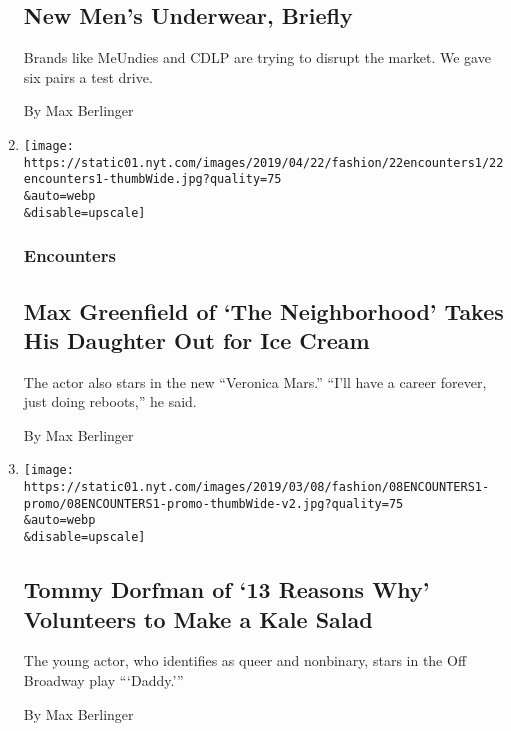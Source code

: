 \begin{enumerate}
  \hypertarget{new-mens-underwear-briefly}{%
  \subsection{New Men's Underwear,
  Briefly}\label{new-mens-underwear-briefly}}

  Brands like MeUndies and CDLP are trying to disrupt the market. We
  gave six pairs a test drive.

  By Max Berlinger
\item
  \href{/2019/04/12/style/max-greenfield-the-neighborhood.html}{}

  \texttt{[image: https://static01.nyt.com/images/2019/04/22/fashion/22encounters1/22encounters1-thumbWide.jpg?quality=75\\\&auto=webp\\\&disable=upscale]}

  \hypertarget{encounters-2}{%
  \subsubsection{Encounters}\label{encounters-2}}

  \hypertarget{max-greenfield-of-the-neighborhood-takes-his-daughter-out-for-ice-cream}{%
  \subsection{Max Greenfield of `The Neighborhood' Takes His Daughter
  Out for Ice
  Cream}\label{max-greenfield-of-the-neighborhood-takes-his-daughter-out-for-ice-cream}}

  The actor also stars in the new ``Veronica Mars.'' ``I'll have a
  career forever, just doing reboots,'' he said.

  By Max Berlinger
\item
  \href{/2019/03/08/style/tommy-dorfman-daddy-13-reasons-why.html}{}

  \texttt{[image: https://static01.nyt.com/images/2019/03/08/fashion/08ENCOUNTERS1-promo/08ENCOUNTERS1-promo-thumbWide-v2.jpg?quality=75\\\&auto=webp\\\&disable=upscale]}

  \hypertarget{tommy-dorfman-of-13-reasons-why-volunteers-to-make-a-kale-salad}{%
  \subsection{Tommy Dorfman of `13 Reasons Why' Volunteers to Make a
  Kale
  Salad}\label{tommy-dorfman-of-13-reasons-why-volunteers-to-make-a-kale-salad}}

  The young actor, who identifies as queer and nonbinary, stars in the
  Off Broadway play ```Daddy.'''

  By Max Berlinger
\end{enumerate}

